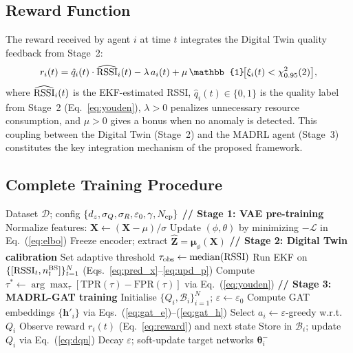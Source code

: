 \documentclass[12pt,a4paper]{article}
\begin{document}
\subsection{Reward Function}

The reward received by agent $i$ at time $t$ integrates the Digital Twin
quality feedback from Stage~2:
\begin{equation}
r_i(t) = \hat{q}_i(t)\cdot\widehat{\rm RSSI}_i(t)
         - \lambda\,a_i(t)
         + \mu\,\mathbb{1}\!\bigl[\xi_i(t) < \chi^2_{0.95}(2)\bigr],
\label{eq:reward}
\end{equation}
where $\widehat{\rm RSSI}_i(t)$ is the EKF-estimated RSSI,
$\hat{q}_i(t)\in\{0,1\}$ is the quality label from Stage~2
(Eq.~\ref{eq:youden}), $\lambda>0$ penalizes unnecessary resource
consumption, and $\mu>0$ gives a bonus when no anomaly is detected. This coupling between the
Digital Twin (Stage~2) and the MADRL agent (Stage~3) constitutes the
key integration mechanism of the proposed framework.

\subsection{Complete Training Procedure}

\begin{algorithm}[H]
\caption{Proposed Framework: Training Procedure}
\label{alg:train}
\begin{algorithmic}[1]
\REQUIRE Dataset $\mathcal{D}$; config $\{d_z, \sigma_Q, \sigma_R,
         \varepsilon_0, \gamma, N_{\rm ep}\}$
\STATE \textbf{// Stage 1: VAE pre-training}
\STATE Normalize features: $\mathbf{X} \leftarrow (\mathbf{X}-\mu)/\sigma$
  \STATE Update $(\phi,\theta)$ by minimizing $-\mathcal{L}$ in Eq.~(\ref{eq:elbo})
\ENDFOR
\STATE Freeze encoder; extract $\hat{\mathbf{Z}} = \bm{\mu}_\phi(\mathbf{X})$
\STATE \textbf{// Stage 2: Digital Twin calibration}
\STATE Set adaptive threshold $\tau_{\rm obs} \leftarrow \mathrm{median}({\rm RSSI})$
\STATE Run EKF on $\{[{\rm RSSI}_t, n^{\rm BS}_t]\}_{t=1}^{N}$
       (Eqs.~\ref{eq:pred_x}--\ref{eq:upd_p})
\STATE Compute $\tau^* \leftarrow \arg\max_\tau[\mathrm{TPR}(\tau)-\mathrm{FPR}(\tau)]$
       via Eq.~(\ref{eq:youden})
\STATE \textbf{// Stage 3: MADRL-GAT training}
\STATE Initialise $\{Q_i, \mathcal{B}_i\}_{i=1}^N$; $\varepsilon \leftarrow \varepsilon_0$
    \STATE Compute GAT embeddings $\{\mathbf{h}'_i\}$ via Eqs.~(\ref{eq:gat_e})--(\ref{eq:gat_h})
    \STATE Select $a_i \leftarrow \varepsilon$-greedy w.r.t.\ $Q_i$
    \STATE Observe reward $r_i(t)$ (Eq.~\ref{eq:reward}) and next state
    \STATE Store in $\mathcal{B}_i$; update $Q_i$ via Eq.~(\ref{eq:dqn})
  \ENDFOR
  \STATE Decay $\varepsilon$; soft-update target networks $\bm{\theta}_i^-$
\ENDFOR
\end{algorithmic}
\end{algorithm}
\end{document}
